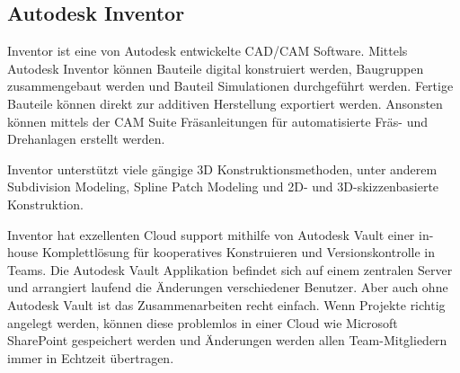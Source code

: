 \subsection{Autodesk Inventor}
\label{sec:inventor}

Inventor ist eine von Autodesk entwickelte \ac{CAD}/\ac{CAM} Software. Mittels Autodesk Inventor können Bauteile digital konstruiert werden, Baugruppen zusammengebaut werden und Bauteil Simulationen durchgeführt werden. Fertige Bauteile können direkt zur additiven Herstellung exportiert werden. Ansonsten können mittels der \ac{CAM} Suite Fräsanleitungen für automatisierte Fräs- und Drehanlagen erstellt werden.

Inventor unterstützt viele gängige 3D Konstruktionsmethoden, unter anderem Subdivision Modeling, Spline Patch Modeling und 2D- und 3D-skizzenbasierte Konstruktion.

Inventor hat exzellenten Cloud support mithilfe von Autodesk Vault einer in-house Komplettlösung für kooperatives Konstruieren und Versionskontrolle in Teams. Die Autodesk Vault Applikation befindet sich auf einem zentralen Server und arrangiert laufend die Änderungen verschiedener Benutzer. Aber auch ohne Autodesk Vault ist das Zusammenarbeiten recht einfach. Wenn Projekte richtig angelegt werden, können diese problemlos in einer Cloud wie Microsoft SharePoint gespeichert werden und Änderungen werden allen Team-Mitgliedern immer in Echtzeit übertragen.
